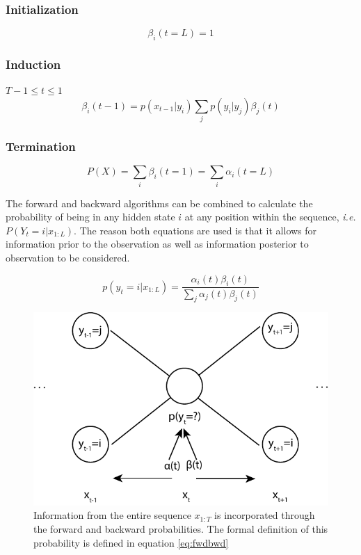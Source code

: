 \subsubsection{Initialization}
\begin{equation}
    \beta_i(t=L) = 1
\label{eq:bwdinit}
\end{equation}

\subsubsection{Induction}
$T-1\leq t\leq 1$
\begin{equation}
\beta_i(t-1) =p(x_{t-1}|y_i)\sum_{j}{p(y_i|y_j)\beta_j(t)}
\label{eq:bwdinduc}
\end{equation}

\subsubsection{Termination}
\begin{equation}
    P(X)= \sum_i{\beta_i(t=1)} = \sum_i{\alpha_i(t=L)}
\label{eq:bwdterm}
\end{equation}

The forward and backward algorithms can be combined to calculate the probability of being in any hidden state $i$ at any position within the sequence, \emph{i.e.} $P(Y_t=i|x_{1:L})$. The reason both equations are used is that it allows for information prior to the observation as well as information posterior to observation to be considered. 

\begin{equation}
p(y_t=i|x_{1:L}) = \frac{\alpha_i(t)\beta_i(t)}{\sum_j{\alpha_j(t)\beta_j(t)}}
\label{eq:fwdbwd}
\end{equation}

\begin{figure}[t]
\centering
\includegraphics[width=\textwidth]{images/fwdbwd.pdf}
\caption{Information from the entire sequence $x_{1:T}$ is incorporated through the forward and backward probabilities. The formal definition of this probability is defined in equation \ref{eq:fwdbwd}}
\label{fig:fwdbwd}
\end{figure}

